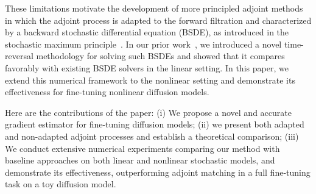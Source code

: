 \documentclass[letterpaper, 10 pt, conference]{ieeeconf}  %
\begin{document}

These limitations motivate the development of more principled adjoint methods in which the adjoint process is adapted to the forward filtration and characterized by a backward stochastic differential equation (BSDE), as introduced in the stochastic maximum principle~\cite{yong1999stochastic}. In our prior work~\cite{taghvaei2024time,mei2025time}, we introduced a novel time-reversal methodology for solving such BSDEs and showed that it compares favorably with existing BSDE solvers in the linear setting. In this paper, we extend this numerical framework to the nonlinear setting and demonstrate its effectiveness for fine-tuning nonlinear diffusion models.

Here are the contributions of the paper: (i) We propose a novel and accurate gradient estimator for fine-tuning diffusion models; (ii) we present both adapted and non-adapted adjoint processes and establish a theoretical comparison; (iii) We conduct extensive numerical experiments comparing our method with baseline approaches on both linear and nonlinear stochastic models, and demonstrate its effectiveness, outperforming adjoint matching in a full fine-tuning task on a toy diffusion model.
\end{document}
